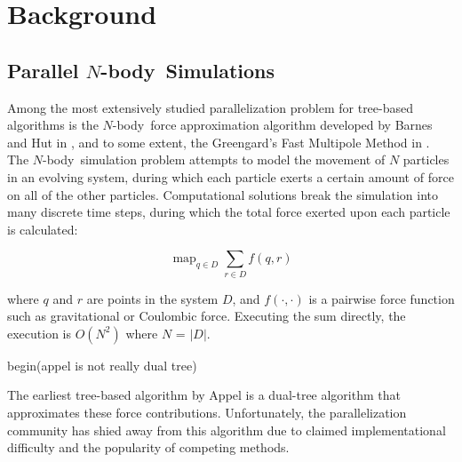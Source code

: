 \documentclass[times, 10pt,twocolumn]{article}
\DeclareMathOperator*{\map}{map}
\newcommand{\nbody}{$N$-body}
\begin{document}
%
%
%
%
%
%
%
%

\section{Background}

\subsection{Parallel \nbody\ Simulations}

Among the most extensively studied parallelization problem for tree-based algorithms is the \nbody\ force approximation algorithm developed by Barnes and Hut in \cite{barneshut}, and to some extent, the Greengard's Fast Multipole Method in \cite{fmm}.
The \nbody\ simulation problem attempts to model the movement of $N$ particles in an evolving system, during which each particle exerts a certain amount of force on all of the other particles.
Computational solutions break the simulation into many discrete time steps, during which the total force exerted upon each particle is calculated:

 $$\map_{q \in D} \sum_{r \in D} f(q, r)$$

\noindent where $q$ and $r$ are points in the system $D$, and $f(\cdot, \cdot)$ is a pairwise force function such as gravitational or Coulombic force.
Executing the sum directly, the execution is $O(N^2)$ where $N$ = $|D|$.

begin(appel is not really dual tree)

The earliest tree-based algorithm by Appel \cite{appel} is a dual-tree algorithm that approximates these force contributions.
Unfortunately, the parallelization community has shied away from this algorithm due to claimed implementational difficulty and the popularity of competing methods.
\end{document}
